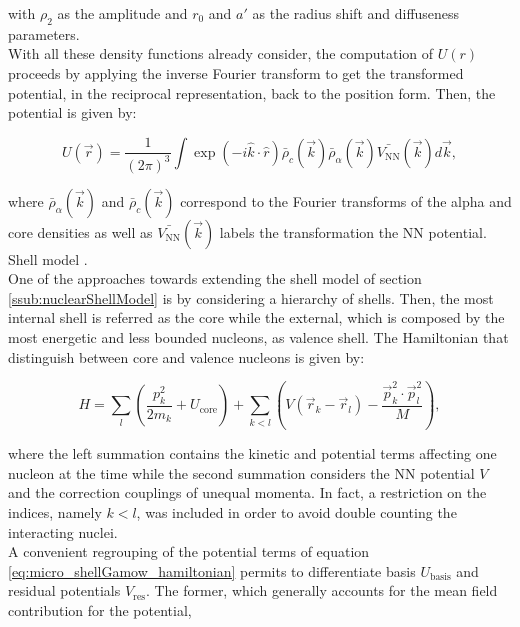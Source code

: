 \documentclass[openany]{book}
\begin{document}
with $\rho_2$ as the amplitude and $r_0$ and $a'$ as the radius shift and diffuseness parameters. \\ 

With all these density functions already consider, the computation of $U(r)$ proceeds by applying the inverse Fourier transform to get the transformed potential, in the reciprocal representation, back to the position form. Then, the potential is given by:

\begin{equation}\label{eq:micro_doubleFolding_potential_Fourier}
	U(\vec r ) = \frac{1}{(2\pi)^3} \int { \exp{(-i\hat k \cdot \hat r )} \bar {\rho}_c(\vec k)  \bar {\rho}_\alpha (\vec k) \bar{V_{\mathrm{NN}}}(\vec k)  d\vec k},
\end{equation}

where $\bar {\rho}_\alpha (\vec k)$ and $\bar {\rho}_c(\vec k) $ correspond to the Fourier transforms of the alpha and core densities as well as $\bar{V_{\mathrm{NN}}}(\vec k)$ labels the transformation the $\mathrm{NN}$ potential.  \\

Shell model \cite{dong_wang_michel_ploszajczak_2022}.  \\

One of the approaches towards extending the shell model of section \ref{ssub:nuclearShellModel} is by considering a hierarchy of shells. Then, the most internal shell is referred as the core while the external, which is composed by the most energetic and less bounded nucleons, as valence shell. The Hamiltonian that  distinguish between core and valence nucleons is given by:

\begin{equation}\label{eq:micro_shellGamow_hamiltonian}
	H = \sum_l  \left( \frac{p^2_k}{2m_k} + U_{\mathrm{core}} \right) + \sum_{k < l} \left( {V(\vec r_k - \vec r_l) - \frac{\vec p^2_k \cdot \vec p^2_l}{M}} \right),
\end{equation}

where the left summation contains the kinetic and potential terms affecting one nucleon at the time while the second summation considers the $\mathrm{NN}$ potential $V$ and the correction couplings of unequal momenta. In fact, a restriction on the indices, namely $k < l$, was included in order to avoid double counting the interacting nuclei. \\   

A convenient regrouping of the potential terms of equation \ref{eq:micro_shellGamow_hamiltonian} permits to differentiate basis $U_{\mathrm{basis}}$ and residual potentials $V_{\mathrm{res}}$. The former, which generally accounts for the mean field contribution for the potential, 
\end{document}
